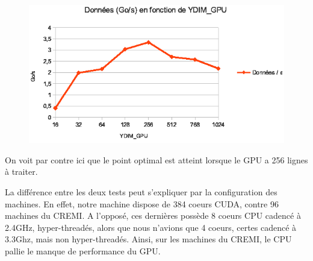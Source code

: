 		\begin{figure}[H]
			\centering
			\includegraphics[scale=1.0]{go_cremi.png}
		\end{figure}

On voit par contre ici que le point optimal est atteint lorsque le GPU a 256 lignes à traiter.

La différence entre les deux tests peut s'expliquer par la configuration des machines. En effet, notre machine dispose de 384 coeurs CUDA, contre 96 
machines du CREMI. A l'opposé, ces dernières possède 8 coeurs CPU cadencé à 2.4GHz, hyper-threadés, alors que nous n'avions que 4 coeurs, certes cadencé à 3.3Ghz, mais non hyper-threadés. Ainsi, sur les machines du CREMI, le CPU pallie le manque de performance du GPU.